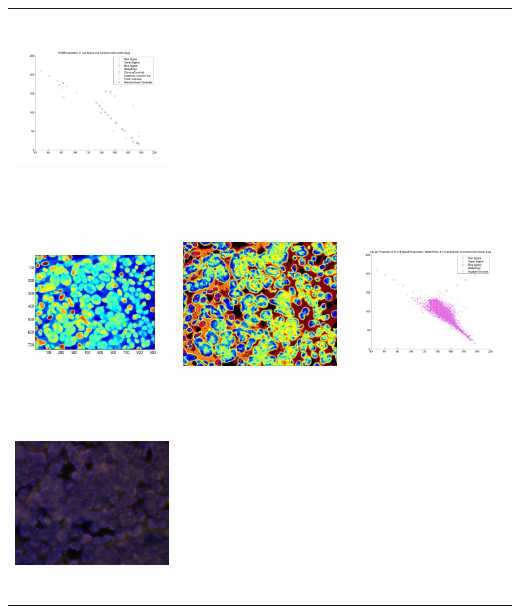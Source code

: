 \begin{tabular}{ |c|c|c| }
\includegraphics[width=5.0cm,height=5.0cm]{images/Her2Fish/3_abConvexHull.jpg} \\
\includegraphics[width=5.0cm,height=5.0cm]{images/Her2Fish/3_BlueMaskOpen.jpg}   &
\includegraphics[width=5.0cm,height=5.0cm]{images/Her2Fish/3_RGB_LabelImg.jpg}    &
\includegraphics[width=5.0cm,height=5.0cm]{images/Her2Fish/3_SampleChromas.jpg}  \\
\includegraphics[width=5.0cm,height=5.0cm]{images/Her2Fish/4.jpg}               &

\end{tabular}
